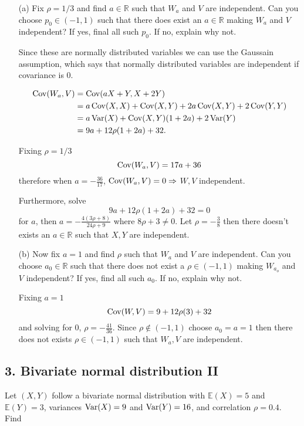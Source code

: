 \documentclass{tufte-book}
\begin{document}
\begin{enumerate}

\item[(a)] Fix $\rho=1/3$ and find $a \in \mathbb{R}$ such that $W_a$ and $V$ are independent.  Can you choose $p_0 \in (-1,1)$ such that there does exist an $a\in \mathbb{R}$ making $W_a$ and $V$ independent?  If yes, final all such $p_0$.  If no, explain why not.

Since these are normally distributed variables we can use the Gaussain assumption, which says that normally distributed variables are independent if covariance is $0$.

\begin{align*}
\operatorname{Cov}(W_a, V) &= \operatorname{Cov}(aX+Y, X+2Y)\\
&= a\operatorname{Cov}(X,X) + \operatorname{Cov}(X,Y) + 2a\operatorname{Cov}(X,Y) + 2\operatorname{Cov}(Y,Y)\\
&= a\operatorname{Var}(X) + \operatorname{Cov}(X,Y)(1+2a) + 2\operatorname{Var}(Y)\\
&= 9a + 12\rho(1+2a) + 32.
\end{align*}

Fixing $\rho=1/3$
\[ \operatorname{Cov}(W_a,V) = 17a + 36 \]
therefore when $a= -\frac{36}{17}$, $\operatorname{Cov}(W_a,V)=0\Rightarrow$ $W,V$ independent.

Furthermore, solve
\[  9a + 12\rho(1+2a) + 32 = 0\]
for $a$, then $a=-\frac{4(3\rho + 8)}{24\rho + 9}$ where $8\rho +3 \neq0$.  Let $\rho=-\frac{3}{8}$ then there doesn't exists an $a\in \mathbb{R}$ such that $X,Y$ are independent.

\item[(b)] Now fix $a=1$ and find $\rho$ such that $W_a$ and $V$ are independent.  Can you choose $a_0 \in \mathbb{R}$ such that there does not exist a $\rho \in (-1,1)$ making $W_{a_o}$ and $V$ independent?  If yes, find all such $a_0$.  If no, explain why not.

Fixing $a=1$
\[ \operatorname{Cov}(W,V) = 9+12\rho(3) + 32 \]
and solving for $0$, $\rho=-\frac{41}{36}$.  Since $\rho \not\in (-1,1)$ choose $a_0=a=1$ then there does not exists $\rho \in (-1,1)$ such that $W_a,V$ are independent.

\end{enumerate}

\subsection{3. Bivariate normal distribution II}
Let $(X,Y)$ follow a bivariate normal distribution with $\mathbb{E}(X)=5$ and $\mathbb{E}(Y)=3$, variances $\operatorname{Var}(X)=9$ and $\operatorname{Var}(Y)=16$, and correlation $\rho=0.4$.  Find
\end{document}
